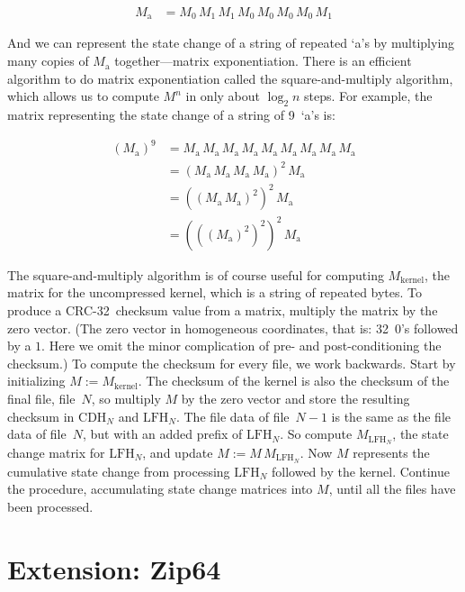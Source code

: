 \documentclass[letterpaper,twocolumn,10pt]{article}
\newcommand{\CDH}{\mathrm{CDH}}
\newcommand{\LFH}{\mathrm{LFH}}
\newcommand{\CRC}{\mbox{CRC-32}}
\begin{document}
\begin{align*}
M_\mathrm{a} &= M_0 \, M_1 \, M_1 \, M_0 \, M_0 \, M_0 \, M_0 \, M_1
\end{align*}

\noindent
And we can represent the state change of a string of repeated `a's
by multiplying many copies of $M_\mathrm{a}$ together---matrix exponentiation.
There is an efficient algorithm to do matrix exponentiation
called the square-and-multiply algorithm,
which allows us to compute $M^n$
in only about $\log_2 n$ steps.
For example, the matrix representing the state change
of a string of 9~`a's is:

\begin{align*}
(M_\mathrm{a})^9 &= M_\mathrm{a} \, M_\mathrm{a} \, M_\mathrm{a} \, M_\mathrm{a} \, M_\mathrm{a} \, M_\mathrm{a} \, M_\mathrm{a} \, M_\mathrm{a} \, M_\mathrm{a} \\
&= (M_\mathrm{a} \, M_\mathrm{a} \, M_\mathrm{a} \, M_\mathrm{a})^2 \, M_\mathrm{a} \\
&= ((M_\mathrm{a} \, M_\mathrm{a})^2)^2 \, M_\mathrm{a} \\
&= (((M_\mathrm{a})^2)^2)^2 \, M_\mathrm{a}
\end{align*}

The square-and-multiply algorithm is of course useful
for computing $M_\mathrm{kernel}$,
the matrix for the uncompressed kernel,
which is a string of repeated bytes.
To produce a \CRC\ checksum value from a matrix,
multiply the matrix by the zero vector.
(The zero vector in homogeneous coordinates, that is:
32~$0$'s followed by a $1$.
Here we omit the minor complication of pre- and post-conditioning the checksum.)
To compute the checksum for every file, we work backwards.
Start by initializing $M := M_\mathrm{kernel}$.
The checksum of the kernel is also the checksum
of the final file, file~$N$,
so multiply $M$ by the zero vector and store the resulting checksum in
$\CDH_N$ and $\LFH_N$.
The file data of file~$N-1$ is the same as the file data of file~$N$,
but with an added prefix of $\LFH_N$.
So compute $M_{\LFH_N}$, the state change matrix for $\LFH_N$,
and update $M := M \, M_{\LFH_N}$.
Now $M$ represents the cumulative state change from processing
$\LFH_N$ followed by the kernel.
Continue the procedure, accumulating state change matrices into $M$,
until all the files have been processed.


\section{Extension: Zip64}
\label{sec:zip64}
\end{document}

